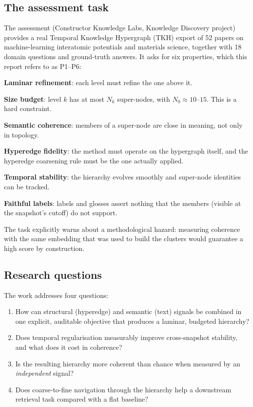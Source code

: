 \documentclass[11pt,a4paper]{article}
\theoremstyle{remark}
\begin{document}
\subsection{The assessment task}

The assessment (Constructor Knowledge Labs, Knowledge Discovery project) provides a
real Temporal Knowledge Hypergraph (TKH) export of 52 papers on machine-learning
interatomic potentials and materials science, together with 18 domain questions
and ground-truth answers. It asks for six properties, which this report refers to as
P1--P6:

\begin{description}[leftmargin=1.2cm,style=nextline]
  \item[P1] \textbf{Laminar refinement}: each level must refine the one above it.
  \item[P2] \textbf{Size budget}: level $k$ has at most $N_k$ super-nodes, with
            $N_0\approx 10$--$15$. This is a hard constraint.
  \item[P3] \textbf{Semantic coherence}: members of a super-node are close in
            meaning, not only in topology.
  \item[P4] \textbf{Hyperedge fidelity}: the method must operate on the
            hypergraph itself, and the hyperedge coarsening rule must be the one
            actually applied.
  \item[P5] \textbf{Temporal stability}: the hierarchy evolves smoothly and
            super-node identities can be tracked.
  \item[P6] \textbf{Faithful labels}: labels and glosses assert nothing that the
            members (visible at the snapshot's cutoff) do not support.
\end{description}

The task explicitly warns about a methodological hazard: measuring coherence with
the same embedding that was used to build the clusters would guarantee a high
score by construction.

\subsection{Research questions}

The work addresses four questions:

\begin{enumerate}[label=\textbf{RQ\arabic*}]
  \item How can structural (hyperedge) and semantic (text) signals be combined in
        one explicit, auditable objective that produces a laminar, budgeted
        hierarchy?
  \item Does temporal regularisation measurably improve cross-snapshot stability,
        and what does it cost in coherence?
  \item Is the resulting hierarchy more coherent than chance when measured by an
        \emph{independent} signal?
  \item Does coarse-to-fine navigation through the hierarchy help a downstream
        retrieval task compared with a flat baseline?
\end{enumerate}
\end{document}
